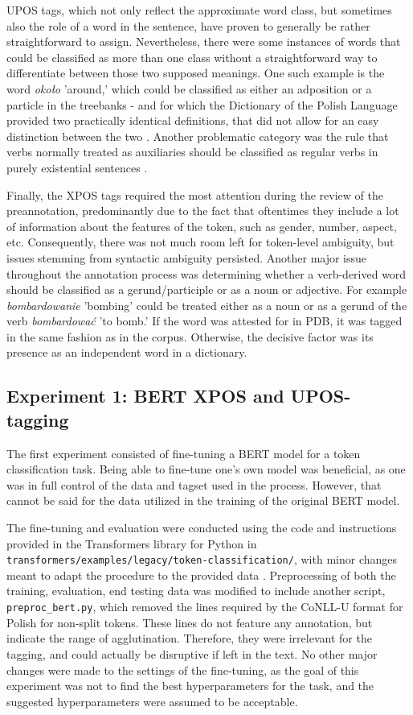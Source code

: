 UPOS tags, which not only reflect the approximate word class, but sometimes also the role of a word in the sentence, have proven to generally be rather straightforward to assign. Nevertheless, there were some instances of words that could be classified as more than one class without a straightforward way to differentiate between those two supposed meanings. One such example is the word \textit{około} 'around,' which could be classified as either an adposition or a particle in the treebanks - and for which the Dictionary of the Polish Language provided two practically identical definitions, that did not allow for an easy distinction between the two \citep{okolopwn}. Another problematic category was the rule that verbs normally treated as auxiliaries should be classified as regular verbs in purely existential sentences \citep{polishud}. 

Finally, the XPOS tags required the most attention during the review of the preannotation, predominantly due to the fact that oftentimes they include a lot of information about the features of the token, such as gender, number, aspect, etc. Consequently, there was not much room left for token-level ambiguity, but issues stemming from syntactic ambiguity persisted. Another major issue throughout the annotation process was determining whether a verb-derived word should be classified as a gerund/participle or as a noun or adjective. For example \textit{bombardowanie} 'bombing' could be treated either as a noun or as a gerund of the verb \textit{bombardować} 'to bomb.' If the word was attested for in PDB, it was tagged in the same fashion as in the corpus. Otherwise, the decisive factor was its presence as an independent word in a dictionary.  

\subsection{Experiment 1: BERT XPOS and UPOS-tagging}
\label{subsec:bert-tagging}

The first experiment consisted of fine-tuning a BERT model for a token classification task. Being able to fine-tune one's own model was beneficial, as one was in full control of the data and tagset used in the process. However, that cannot be said for the data utilized in the training of the original BERT model. 

The fine-tuning and evaluation were conducted using the code and instructions provided in the Transformers library for Python in \texttt{transformers/examples/legacy/token-classification/}, with minor changes meant to adapt the procedure to the provided data  \citep{wolf-etal-2020-transformers}. Preprocessing of both the training, evaluation, end testing data was modified to include another script, \texttt{preproc\_bert.py}, which removed the lines required by the CoNLL-U format for Polish for non-split tokens. These lines do not feature any annotation, but indicate the range of agglutination. Therefore, they were irrelevant for the tagging, and could actually be disruptive if left in the text. No other major changes were made to the settings of the fine-tuning, as the goal of this experiment was not to find the best hyperparameters for the task, and the suggested hyperparameters were assumed to be acceptable.

